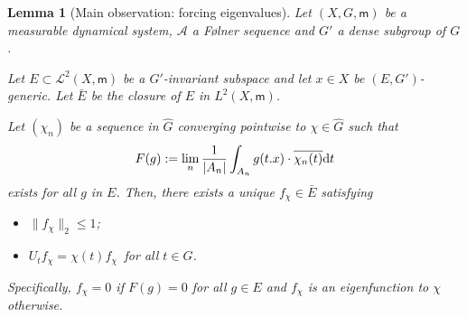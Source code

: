 \documentclass [14pt]{amsart}
\numberwithin{equation}{section}
\newcommand{\cA}{{\mathcal A}}
\newcommand{\mm}{\mathsf{m}}
\newcommand{\dd}{\mbox{\rm d}}
\newtheorem{lemma}[theorem]{Lemma}
\begin{document}
\begin{lemma}[Main observation: forcing  eigenvalues] \label{lem-eigen-exi} Let $(X,G, \mm)$ be a measurable dynamical system, $\cA$ a F\o lner sequence and $G'$ a dense subgroup of $G$.

Let $E\subset \mathcal{L}^2 (X,\mm)$ be a $G'$-invariant subspace and let $x\in X$ be $(E,G')$-generic. Let $\bar{E}$ be the closure of $E$ in $L^2(X, \mm)$.

Let $(\chi_n)$ be a sequence in $\widehat{G}$  converging pointwise to $\chi \in \widehat{G}$ such that
$$ F(g):= \lim_n\frac{1}{|A_n|} \int_{A_n} g(t.x) \cdot \overline{\chi_n(t)} \dd t$$
exists for all $g$ in $E$. Then, there exists a unique  $f_\chi \in \bar{E}$  satisfying
\begin{itemize}
  \item{} $\| f_\chi \|_2 \leq 1$;
  \item{} $U_t f_\chi = \chi(t) f_\chi \,$ for all $t\in G$.
\end{itemize}
Specifically, $f_\chi =0$ if $F(g) = 0$ for all $g\in E$ and  $f_\chi$ is an eigenfunction to $\chi$ otherwise.
\end{lemma}
\end{document}
